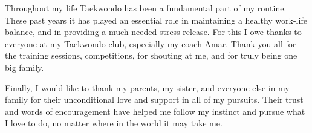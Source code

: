 Throughout my life Taekwondo has been a fundamental part of my routine. These past years it has played an essential role in maintaining a healthy work-life balance, and in providing a much needed stress release. For this I owe thanks to everyone at my Taekwondo club, especially my coach Amar. Thank you all for the training sessions, competitions, for shouting at me, and for truly being one big family. 

Finally, I would like to thank my parents, my sister, and everyone else in my family for their unconditional love and support in all of my pursuits. Their trust and words of encouragement have helped me follow my instinct and pursue what I love to do, no matter where in the world it may take me.